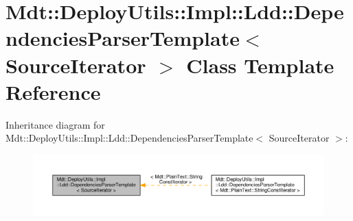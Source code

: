 \hypertarget{class_mdt_1_1_deploy_utils_1_1_impl_1_1_ldd_1_1_dependencies_parser_template}{}\section{Mdt\+:\+:Deploy\+Utils\+:\+:Impl\+:\+:Ldd\+:\+:Dependencies\+Parser\+Template$<$ Source\+Iterator $>$ Class Template Reference}
\label{class_mdt_1_1_deploy_utils_1_1_impl_1_1_ldd_1_1_dependencies_parser_template}


Inheritance diagram for Mdt\+:\+:Deploy\+Utils\+:\+:Impl\+:\+:Ldd\+:\+:Dependencies\+Parser\+Template$<$ Source\+Iterator $>$\+:
\nopagebreak
\begin{figure}[H]
\begin{center}
\leavevmode
\includegraphics[width=350pt]{class_mdt_1_1_deploy_utils_1_1_impl_1_1_ldd_1_1_dependencies_parser_template__inherit__graph}
\end{center}
\end{figure}
